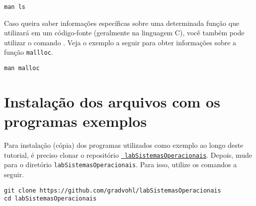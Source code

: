 \begin{lstlisting}[style=MyBashStyle]
man ls
\end{lstlisting}

Caso queira saber informações específicas sobre uma determinada função que utilizará em um código-fonte (geralmente na linguagem C), você também pode utilizar o comando . Veja o exemplo a seguir para obter informações sobre a função \texttt{mallloc}.

\begin{lstlisting}[style=MyBashStyle]
man malloc
\end{lstlisting}

\section{Instalação dos arquivos com os programas exemplos}
Para instalação (cópia) dos programas utilizados como exemplo ao longo deste tutorial, é preciso clonar o repositório \href{https://github.com/gradvohl/labSistemasOperacionais}{\faGithub\ \texttt{labSistemasOperacionais}}. Depois, mude para o diretório \texttt{lab\-Sis\-te\-mas\-Ope\-ra\-ci\-onais}. Para isso, utilize os comandos a seguir.

\begin{lstlisting}[style=MyBashStyle]
git clone https://github.com/gradvohl/labSistemasOperacionais
cd labSistemasOperacionais
\end{lstlisting}
